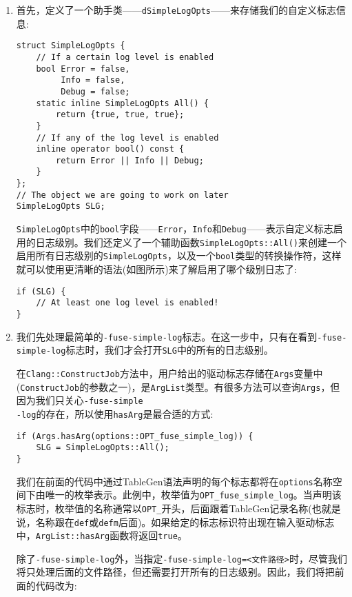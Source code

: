 \begin{enumerate}
\item 首先，定义了一个助手类——\texttt{dSimpleLogOpts}——来存储我们的自定义标志信息:
\begin{lstlisting}[style=styleCXX]
struct SimpleLogOpts {
	// If a certain log level is enabled
	bool Error = false,
	     Info = false,
	     Debug = false;
	static inline SimpleLogOpts All() {
		return {true, true, true};
	}
	// If any of the log level is enabled
	inline operator bool() const {
		return Error || Info || Debug;
	}
};
// The object we are going to work on later
SimpleLogOpts SLG;
\end{lstlisting}

\texttt{SimpleLogOpts}中的\texttt{bool}字段——\texttt{Error}，\texttt{Info}和\texttt{Debug}——表示自定义标志启用的日志级别。我们还定义了一个辅助函数\texttt{SimpleLogOpts::All()}来创建一个启用所有日志级别的\texttt{SimpleLogOpts}，以及一个\texttt{bool}类型的转换操作符，这样就可以使用更清晰的语法(如图所示)来了解启用了哪个级别日志了:

\begin{lstlisting}[style=styleCXX]
if (SLG) {
	// At least one log level is enabled!
}
\end{lstlisting}

\item 我们先处理最简单的\texttt{-fuse-simple-log}标志。在这一步中，只有在看到\texttt{-fuse-simple-log}标志时，我们才会打开\texttt{SLG}中的所有的日志级别。

在\texttt{Clang::ConstructJob}方法中，用户给出的驱动标志存储在\texttt{Args}变量中(\texttt{ConstructJob}的参数之一)，是\texttt{ArgList}类型。有很多方法可以查询\texttt{Args}，但因为我们只关心\texttt{-fuse-simple\\-log}的存在，所以使用\texttt{hasArg}是最合适的方式:

\begin{lstlisting}[style=styleCXX]
if (Args.hasArg(options::OPT_fuse_simple_log)) {
	SLG = SimpleLogOpts::All();
}
\end{lstlisting}

我们在前面的代码中通过TableGen语法声明的每个标志都将在\texttt{options}名称空间下由唯一的枚举表示。此例中，枚举值为\texttt{OPT\_fuse\_simple\_log}。当声明该标志时，枚举值的名称通常以\texttt{OPT\_}开头，后面跟着TableGen记录名称(也就是说，名称跟在\texttt{def}或\texttt{defm}后面)。如果给定的标志标识符出现在输入驱动标志中，\texttt{ArgList::hasArg}函数将返回\texttt{true}。

除了\texttt{-fuse-simple-log}外，当指定\texttt{-fuse-simple-log=<文件路径>}时，尽管我们将只处理后面的文件路径，但还需要打开所有的日志级别。因此，我们将把前面的代码改为:


\end{enumerate}
